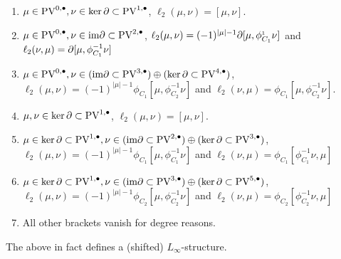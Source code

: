 \documentclass[11pt]{article}
\begin{document}
\begin{itemize}
\begin{itemize}
\begin{enumerate}
\item \(\mu\in\text{PV}^{0,\bullet}, \nu\in\ker\partial\subset\text{PV}^{1,\bullet}\), \(\ell_2(\mu,\nu)=[\mu,\nu]\).
\item \(\mu\in\text{PV}^{0,\bullet}, \nu\in\text{im}\partial\subset\text{PV}^{2,\bullet}\), \(\ell_2(\mu,\nu)=(-1)^{|\mu|-1}\partial[\mu,\phi^{_1}_{C_1}\nu]\) and \(\ell_2(\nu,\mu)=\partial[\mu,\phi^{-1}_{C_1}\nu]\)
\item \(\mu\in\text{PV}^{0,\bullet}, \nu\in(\text{im}\partial\subset\text{PV}^{3,\bullet})\oplus(\ker\partial\subset\text{PV}^{4,\bullet})\), \(\ell_2(\mu,\nu)=(-1)^{|\mu|-1}\phi_{C_1}[\mu, \phi^{-1}_{C_2}\nu]\) and \(\ell_2(\nu, \mu)=\phi_{C_1}[\mu, \phi^{-1}_{C_2}\nu]\).
\item \(\mu,\nu\in\ker\partial\subset\text{PV}^{1,\bullet}\), \(\ell_2(\mu,\nu)=[\mu,\nu]\).
\item \(\mu\in\ker\partial\subset\text{PV}^{1,\bullet}, \nu\in(\text{im}\partial\subset\text{PV}^{2,\bullet})\oplus(\ker\partial\subset\text{PV}^{3,\bullet})\), \(\ell_2(\mu,\nu)=(-1)^{|\mu|-1}\phi_{C_1}[\mu, \phi^{-1}_{C_1}\nu]\) and \(\ell_2(\nu, \mu)=\phi_{C_1}[\phi^{-1}_{C_1}\nu, \mu]\)
\item \(\mu\in\ker\partial\subset\text{PV}^{1,\bullet}, \nu\in(\text{im}\partial\subset\text{PV}^{3,\bullet})\oplus(\ker\partial\subset\text{PV}^{5,\bullet})\), \(\ell_2(\mu,\nu)=(-1)^{|\mu|-1}\phi_{C_2}[\mu, \phi^{-1}_{C_2}\nu]\) and \(\ell_2(\nu, \mu)=\phi_{C_2}[\phi^{-1}_{C_2}\nu, \mu]\)
\item All other brackets vanish for degree reasons.
\end{enumerate}
\end{itemize}
\end{itemize}

\begin{prop}
The above in fact defines a (shifted) $L_\infty$-structure.
\end{prop}
\end{document}
